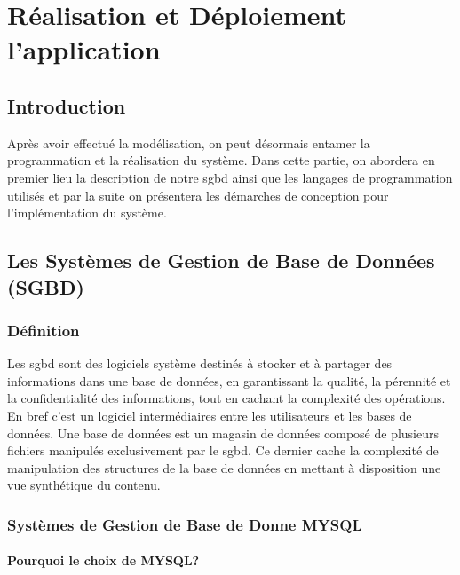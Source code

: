 
	  
	  
	 


\chapter{ Réalisation et Déploiement  l'application}
\minitoc
\newpage
\section{Introduction}
Après avoir effectué  la modélisation, on peut désormais entamer la programmation et la réalisation du système. Dans cette partie, on abordera en premier lieu la description de notre \gls{sgbd} ainsi que les langages de programmation utilisés et par la suite on présentera les démarches de conception pour l'implémentation du système. 

\section{Les Systèmes de Gestion de Base de Données (SGBD)}
\subsection{Définition}
Les \gls{sgbd} sont des logiciels système destinés à stocker et à partager des informations dans une base de données, en garantissant la qualité, la pérennité et la confidentialité des informations, tout en cachant la complexité des opérations. En bref c'est un logiciel intermédiaires entre les utilisateurs et les bases de données. Une base de données est un magasin de données composé de plusieurs fichiers manipulés exclusivement par le \gls{sgbd}. Ce dernier cache la complexité de manipulation des structures de la base de données en mettant à disposition une vue synthétique du contenu.
\medskip

\subsection{Systèmes de Gestion de Base de Donne MYSQL}

\subsubsection{Pourquoi le choix de MYSQL?}

